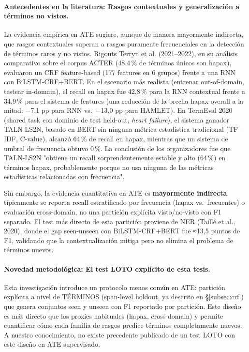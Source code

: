 \paragraph{Antecedentes en la literatura: Rasgos contextuales y generalización a términos no vistos.}
La evidencia empírica en ATE sugiere, aunque de manera mayormente indirecta, que rasgos contextuales superan a rasgos puramente frecuenciales en la detección de términos raros y no vistos. Rigouts Terryn et al. (2021--2022), en su análisis comparativo sobre el corpus ACTER (48.4\,\% de términos únicos son hapax), evaluaron un CRF feature-based (177 features en 6 grupos) frente a una RNN con BiLSTM-CRF+BERT. En el escenario más realista (entrenar out-of-domain, testear in-domain), el recall en hapax fue 42{,}8\,\% para la RNN contextual frente a 34{,}9\,\% para el sistema de features (una reducción de la brecha hapax-overall a la mitad: −7{,}1 pp para RNN vs.\ −13{,}0 pp para HAMLET). En TermEval 2020 (shared task con dominio de test held-out, \textit{heart failure}), el sistema ganador TALN-LS2N, basado en BERT sin ninguna métrica estadística tradicional (TF-IDF, C-value), alcanzó 64\,\% de recall en hapax, mientras que un sistema de umbral de frecuencia obtuvo 0\,\%. La conclusión de los organizadores fue que TALN-LS2N "obtiene un recall sorprendentemente estable y alto (64\,\%) en términos hapax, probablemente porque no usa ninguna de las métricas estadísticas relacionadas con frecuencia".

Sin embargo, la evidencia cuantitativa en ATE es \textbf{mayormente indirecta}: típicamente se reporta recall estratificado por frecuencia (hapax vs.\ frecuentes) o evaluación cross-domain, no una partición explícita visto/no-visto con F1 separado. El test más directo de esta partición proviene de NER (Taillé et al., 2020), donde el gap seen-unseen con BiLSTM-CRF+BERT fue ≈13{,}5 puntos de F1, validando que la contextualización mitiga pero no elimina el problema de términos nuevos.

\paragraph{Novedad metodológica: El test LOTO explícito de esta tesis.}
Esta investigación introduce un protocolo menos común en ATE: partición explícita a nivel de TÉRMINOS (span-level holdout, ya descrito en §\ref{subsec:crf}) que genera conjuntos seen y unseen con F1 reportado por partición. Este diseño es más directo que los proxies habituales (hapax, cross-domain) y permite cuantificar cómo cada familia de rasgos predice términos completamente nuevos. A nuestro conocimiento, no existe precedente publicado de un test LOTO con este diseño en ATE supervisado.

